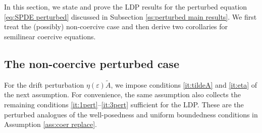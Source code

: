 \documentclass{amsart}
\newcommand{\<}{\langle}
\newcommand{\?}{\rangle}
\theoremstyle{plain}
\theoremstyle{remark}
\theoremstyle{plain}
\numberwithin{equation}{section}
\newcommand{\eps}{\varepsilon}
\begin{document}
In this section, we state and prove the LDP results for the perturbed equation \eqref{eq:SPDE perturbed} discussed in Subsection \ref{ss:perturbed main results}. We first treat  the (possibly) non-coercive case and then derive two corollaries for semilinear coercive equations.


\subsection{The non-coercive perturbed case}
  

For the drift perturbation $\eta(\eps)\tilde A$, we impose conditions \ref{it:tildeA} and \ref{it:eta} of the next assumption. For convenience, the same assumption also   collects the 
remaining conditions \ref{it:1pert}--\ref{it:3pert} sufficient for the LDP. These are the perturbed analogues of the well-posedness and uniform boundedness conditions in Assumption \ref{ass:coer replace}.
\end{document}
